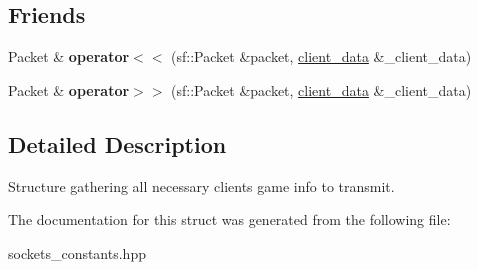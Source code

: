 \subsection*{Friends}
\begin{DoxyCompactItemize}
\item 
\mbox{\label{structclient__data_ac553bfe181c1321ede21179e8e7f93f8}} 
Packet \& {\bfseries operator$<$$<$} (sf\+::\+Packet \&packet, \hyperlink{structclient__data}{client\+\_\+data} \&\+\_\+client\+\_\+data)
\item 
\mbox{\label{structclient__data_af010aea560214b795030bb34493d7db7}} 
Packet \& {\bfseries operator$>$$>$} (sf\+::\+Packet \&packet, \hyperlink{structclient__data}{client\+\_\+data} \&\+\_\+client\+\_\+data)
\end{DoxyCompactItemize}


\subsection{Detailed Description}
Structure gathering all necessary client\textquotesingle{}s game info to transmit. 

The documentation for this struct was generated from the following file\+:\begin{DoxyCompactItemize}
\item 
sockets\+\_\+constants.\+hpp\end{DoxyCompactItemize}
